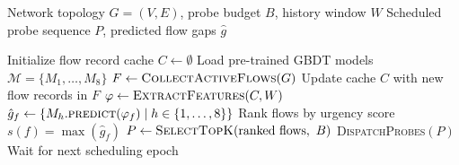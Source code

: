
\begin{algorithm}
\caption{Online Predictive Probe Scheduling}
\label{alg:online-scheduling}
\begin{algorithmic}[1]
\Require Network topology $G=(V,E)$, probe budget $B$, history window $W$
\Ensure Scheduled probe sequence $P$, predicted flow gaps $\hat{g}$

  \State Initialize flow record cache $C \leftarrow \emptyset$
  \State Load pre-trained GBDT models $\mathcal{M} = \{M_1, \ldots, M_8\}$
    \State $F \leftarrow \textsc{CollectActiveFlows}(G)$
    \State Update cache $C$ with new flow records in $F$
    \State $\varphi \leftarrow \textsc{ExtractFeatures}(C, W)$
      \State $\hat{g}_f \leftarrow \{M_h.\textsc{predict}(\varphi_f) \mid h \in \{1,\ldots,8\}\}$
    \EndFor
    \State Rank flows by urgency score $s(f) = \max(\hat{g}_f)$
    \State $P \leftarrow \textsc{SelectTopK}(\text{ranked flows},\ B)$
    \State \textsc{DispatchProbes}$(P)$
    \State Wait for next scheduling epoch
  \EndWhile
\EndProcedure
\end{algorithmic}
\end{algorithm}

